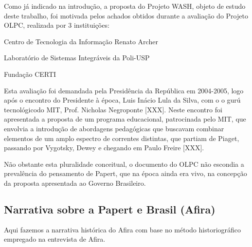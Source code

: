 \documentclass[
12pt,		%
openright,	%
twoside,  %
a4paper,			%
chapter=TITLE,		%
english,			%
french,				%
spanish,			%
brazil				%
]{USPSC-classe/USPSC}
\begin{document}
Como j\'a indicado na introdu\c{c}\~ao, a proposta do Projeto WASH, objeto de estudo deste trabalho, foi motivada pelos achados obtidos durante a avalia\c{c}\~ao do Projeto OLPC, realizada por 3 institui\c{c}\~oes:











\begin{alineas}
\item Centro de Tecnologia da Informa\c{c}\~ao Renato Archer
\item Laborat\'orio de Sistemas Integr\'aveis da Poli-USP
\item Funda\c{c}\~ao CERTI
\end{alineas}

Esta avalia\c{c}\~ao foi demandada pela Presid\^encia da Rep\'ublica em 2004-2005, logo ap\'os o encontro do Presidente \`a \'epoca, Luis In\'acio Lula da Silva, com o o \textquotedbl gur\'u tecnol\'ogico\textquotedbl  do MIT, Prof. Nicholas Negroponte [XXX]. Neste encontro foi apresentada a proposta de um programa educacional, patrocinada pelo MIT, que envolvia a introdu\c{c}\~ao de abordagens pedag\'ogicas que buscavam combinar elementos de um amplo espectro de correntes distintas, que partiam de Piaget, passando por Vygotsky, Dewey e chegando em Paulo Freire [XXX].










N\~ao obstante esta pluralidade conceitual, o documento do OLPC n\~ao escondia a preval\^encia do pensamento de Papert, que na \'epoca ainda era vivo, na concep\c{c}\~ao da proposta apresentada ao Governo Brasileiro.










\subsection[Narrativa sobre a Papert e Brasil (Afira)]{Narrativa sobre a Papert e Brasil (Afira)}\label{Narrativa sobre a Papert e Brasil (Afira)}
Aqui fazemos a narrativa hist\'orica do Afira com base no m\'etodo historiogr\'afico empregado na entrevista de Afira.
\end{document}
